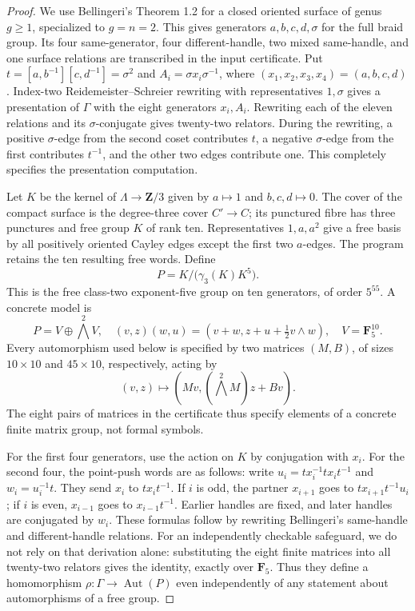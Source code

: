 \begin{proof}
We use Bellingeri's Theorem 1.2 \citep[Theorem~1.2]{Bellingeri2004} for a closed oriented surface of
genus $g\ge1$, specialized to $g=n=2$. This gives generators
$a,b,c,d,\sigma$ for the full braid group. Its four same-generator,
four different-handle, two mixed same-handle, and one surface
relations are transcribed in the input certificate. Put
$t=[a,b^{-1}][c,d^{-1}]=\sigma^2$ and
$A_i=\sigma x_i\sigma^{-1}$, where
$(x_1,x_2,x_3,x_4)=(a,b,c,d)$. Index-two Reidemeister--Schreier
rewriting with representatives $1,\sigma$ gives a presentation of
$\Gamma$ with the eight generators $x_i,A_i$. Rewriting each of
the eleven relations and its $\sigma$-conjugate gives twenty-two
relators. During the rewriting, a positive $\sigma$-edge from the
second coset contributes $t$, a negative $\sigma$-edge from the
first contributes $t^{-1}$, and the other two edges contribute
one. This completely specifies the presentation computation.

Let $K$ be the kernel of $\Lambda\to\mathbf Z/3$ given by
$a\mapsto1$ and $b,c,d\mapsto0$. The cover of the compact surface
is the degree-three cover $C'\to C$; its punctured fibre has three
punctures and free group $K$ of rank ten. Representatives
$1,a,a^2$ give a free basis by all positively oriented Cayley edges
except the first two $a$-edges. The program retains the ten resulting
free words. Define
\[
 P=K/\bigl(\gamma_3(K)K^5\bigr).
\]
This is the free class-two exponent-five group on ten generators,
of order $5^{55}$. A concrete model is
\[
 P=V\oplus\bigwedge^2V,
 \quad (v,z)(w,u)=(v+w,z+u+\tfrac12v\wedge w),
 \quad V=\mathbf F _5^{10}.
\]
Every automorphism used below is specified by two matrices $(M,B)$,
of sizes $10\times10$ and $45\times10$, respectively, acting by
\[
              (v,z)\longmapsto(Mv,(\bigwedge^2M)z+Bv).
                                                               \tag{FC.2}
\]
The eight pairs of matrices in the certificate thus specify elements
of a concrete finite matrix group, not formal symbols.

For the first four generators, use the action on $K$ by conjugation
with $x_i$. For the second four, the point-push words are as follows:
write $u_i=t x_i^{-1}t x_i t^{-1}$ and $w_i=u_i^{-1}t$.
They send $x_i$ to $t x_i t^{-1}$. If $i$ is odd, the partner
$x_{i+1}$ goes to $t x_{i+1}t^{-1}u_i$; if $i$ is even,
$x_{i-1}$ goes to $x_{i-1}t^{-1}$. Earlier handles are fixed,
and later handles are conjugated by $w_i$. These formulas follow
by rewriting Bellingeri's same-handle and different-handle relations.
For an independently checkable safeguard, we do not rely on that
derivation alone: substituting the eight finite matrices into all
twenty-two relators gives the identity, exactly over $\mathbf F _5$.
Thus they define a homomorphism
$\rho:\Gamma\to\operatorname{Aut}(P)$ even independently of
any statement about automorphisms of a free group.


\end{proof}
